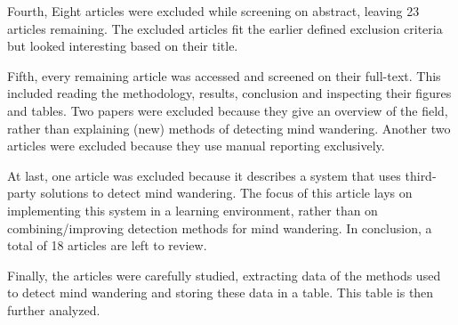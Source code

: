Fourth, Eight articles were excluded while screening on abstract, leaving 23 articles remaining. 
The excluded articles fit the earlier defined exclusion criteria but looked interesting based on their title.

Fifth, every remaining article was accessed and screened on their full-text. This included reading the methodology, results, conclusion and inspecting their figures and tables.
Two papers were excluded because they give an overview of the field, rather than explaining (new) methods of detecting mind wandering. 
Another two articles were excluded because they use manual reporting exclusively.

At last, one article was excluded because it describes a system that uses third-party solutions to detect mind wandering. The focus of this article lays on implementing this system in a learning environment, rather than on combining/improving detection methods for mind wandering.
In conclusion, a total of 18 articles are left to review.

Finally, the articles were carefully studied, extracting data of the methods used to detect mind wandering and storing these data in a table. This table is then further analyzed.
